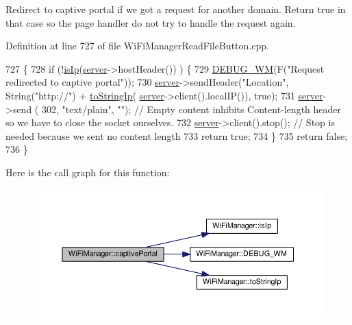Redirect to captive portal if we got a request for another domain. Return true in that case so the page handler do not try to handle the request again. 

Definition at line 727 of file Wi\+Fi\+Manager\+Read\+File\+Button.\+cpp.


\begin{DoxyCode}
727                                    \{
728   \textcolor{keywordflow}{if} (!\hyperlink{class_wi_fi_manager_a9c78a8774f746ec22a99d03a53baa607}{isIp}(\hyperlink{class_wi_fi_manager_a509523a01c0395cf0dc235b074f2a5ea}{server}->hostHeader()) ) \{
729     \hyperlink{class_wi_fi_manager_ae5f595c670ccbcf9a191baf50f5c7c26}{DEBUG\_WM}(F(\textcolor{stringliteral}{"Request redirected to captive portal"}));
730     \hyperlink{class_wi_fi_manager_a509523a01c0395cf0dc235b074f2a5ea}{server}->sendHeader(\textcolor{stringliteral}{"Location"}, String(\textcolor{stringliteral}{"http://"}) + \hyperlink{class_wi_fi_manager_a8dfd64cefecbdf26242b16eca335c20b}{toStringIp}(
      \hyperlink{class_wi_fi_manager_a509523a01c0395cf0dc235b074f2a5ea}{server}->client().localIP()), \textcolor{keyword}{true});
731     \hyperlink{class_wi_fi_manager_a509523a01c0395cf0dc235b074f2a5ea}{server}->send ( 302, \textcolor{stringliteral}{"text/plain"}, \textcolor{stringliteral}{""}); \textcolor{comment}{// Empty content inhibits Content-length header so we have
       to close the socket ourselves.}
732     \hyperlink{class_wi_fi_manager_a509523a01c0395cf0dc235b074f2a5ea}{server}->client().stop(); \textcolor{comment}{// Stop is needed because we sent no content length}
733     \textcolor{keywordflow}{return} \textcolor{keyword}{true};
734   \}
735   \textcolor{keywordflow}{return} \textcolor{keyword}{false};
736 \}
\end{DoxyCode}
Here is the call graph for this function\+:\nopagebreak
\begin{figure}[H]
\begin{center}
\leavevmode
\includegraphics[width=350pt]{d4/dc8/class_wi_fi_manager_a4ef4298deb224212e5242c456669a973_cgraph}
\end{center}
\end{figure}
